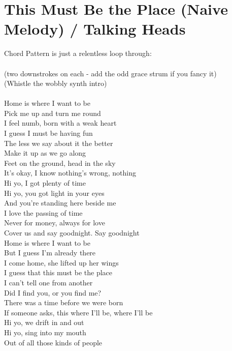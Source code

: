\section{This Must Be the Place (Naive Melody) / Talking Heads}\label{sec:thismustbetheplace}

\Gmajor
\AminorSeven
\BminorSeven


Chord Pattern is just a relentless loop through:\\
   \\
(two downstrokes on each - add the odd grace strum if you fancy it)\\
(Whistle the wobbly synth intro)\\
\\
Home is where I want to be\\
Pick me up and turn me round\\
I feel numb, born with a weak heart\\
I guess I must be having fun\\
The less we say about it the better\\
Make it up as we go along\\
Feet on the ground, head in the sky\\
It's okay, I know nothing's wrong, nothing\\
Hi yo, I got plenty of time\\
Hi yo, you got light in your eyes\\
And you're standing here beside me\\
I love the passing of time\\
Never for money, always for love\\
Cover us and say goodnight. Say goodnight\\
Home is where I want to be\\
But I guess I'm already there\\
I come home, she lifted up her wings\\
I guess that this must be the place\\
I can't tell one from another\\
Did I find you, or you find me?\\
There was a time before we were born\\
If someone asks, this where I'll be, where I'll be\\
Hi yo, we drift in and out\\
Hi yo, sing into my mouth\\
Out of all those kinds of people\\
